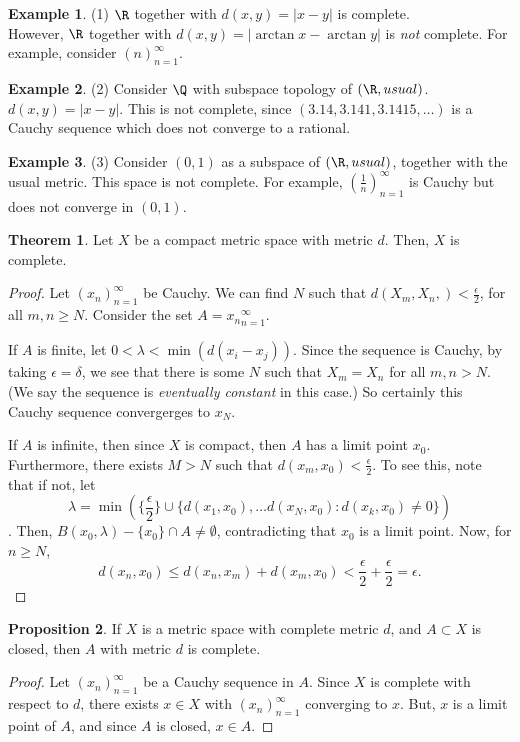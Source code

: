 \documentclass[a5paper]{article}
\theoremstyle{definition}%
\newtheorem{theorem}{Theorem}
\newtheorem{proposition}[theorem]{Proposition}
\newtheorem*{example*}{Example}
\numberwithin{exercise}{section}
\theoremstyle{remark}%
\begin{document}
\begin{example*}(1)
$\R$ together with $d(x,y)=|x-y|$ is complete. \\
However, $\R$ together with $d(x,y)=|\arctan x-\arctan y|$ is \emph{not} complete. For example, consider $(n)_{n=1}^\infty$. 
\end{example*}

\begin{example*}(2)
Consider $\Q$ with subspace topology of $(\R,usual)$. $d(x,y)=|x-y|.$ This is not complete, since $(3.14, 3.141, 3.1415, \ldots)$ is a Cauchy sequence which does not converge to a rational. 
\end{example*}

\begin{example*}(3)
Consider $(0,1)$ as a subspace of $(\R,usual)$, together with the usual metric. This space is not complete. For example, $(\frac{1}{n})_{n=1}^\infty$ is Cauchy but does not converge in $(0,1)$. 
\end{example*}

\begin{highlight}
\begin{theorem}
Let $X$ be a compact metric space with metric $d$. Then, $X$ is complete. 
\end{theorem}
\end{highlight}
\begin{proof}
Let $(x_n)_{n=1}^\infty$ be Cauchy. We can find $N$ such that $d(X_m,X_n,)<\frac{\epsilon}{2}$, for all $m,n\geq N$. Consider the set $A={x_n}_{n=1}^\infty$. 

If $A$ is finite, let $0<\lambda<\min(d(x_i-x_j))$. Since the sequence is Cauchy, by taking $\epsilon=\delta$, we see that there is some $N$ such that $X_m=X_n$ for all $m,n>N$. (We say the sequence is \emph{eventually constant} in this case.) So certainly this Cauchy sequence convergerges to $x_N$. 

If $A$ is infinite, then since $X$ is compact, then $A$ has a limit point $x_0$. Furthermore, there exists $M>N$ such that $d(x_m, x_0)<\frac{\epsilon}{2}$. To see this, note that if not, let $$\lambda=\min(\{\frac{\epsilon}{2}\}\cup \{d(x_1,x_0), \ldots d(x_N,x_0):d(x_k,x_0)\neq0\})$$. Then, $B(x_0,\lambda)-\{x_0\}\cap A \neq \emptyset$, contradicting that $x_0$ is a limit point. Now, for $n\geq N$, $$d(x_n, x_0) \leq d(x_n,x_m)+d(x_m,x_0)<\frac{\epsilon}{2}+\frac{\epsilon}{2}=\epsilon.$$ 
\end{proof}

\begin{highlight}
\begin{proposition}
If $X$ is a metric space with complete metric $d$, and $A\subset X$ is closed, then $A$ with metric $d$ is complete. 
\end{proposition}
\end{highlight}
\begin{proof}
Let $(x_n)_{n=1}^\infty$ be a Cauchy sequence in $A$. Since $X$ is complete with respect to $d$, there exists $x\in X$ with $(x_n)_{n=1}^\infty$ converging to $x$. But, $x$ is a limit point of $A$, and since $A$ is closed, $x\in A$. 
\end{proof}
\end{document}
